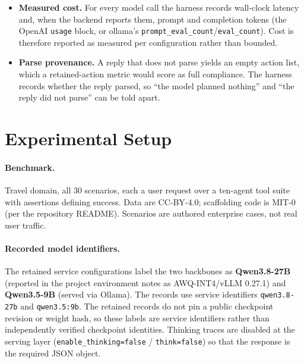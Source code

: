 \documentclass[11pt]{article}
\begin{document}
\begin{itemize}[leftmargin=*,itemsep=2pt]
      logged with the action, the verdict, the number of rounds it consumed, the
      raw reply, and a class: \texttt{explicit\_approve}, \texttt{explicit\_deny},
      \texttt{both\_tokens} (the reply contained both verdict words; the
      conservative choice is taken and the ambiguity is recorded),
      \texttt{unparsed} (no verdict within the round budget) or
      \texttt{all\_errors} (every call failed). Without this classification a
      refusal rate cannot be separated from a parser failure, which is why we
      report the class distribution rather than only the refusal rate.
\item \textbf{Measured cost.} For every model call the harness records wall-clock
      latency and, when the backend reports them, prompt and completion tokens (the
      OpenAI \texttt{usage} block, or ollama's
      \texttt{prompt\_eval\_count}/\texttt{eval\_count}). Cost is therefore
      reported as measured per configuration rather than bounded.
\item \textbf{Parse provenance.} A reply that does not parse yields an empty action
      list, which a retained-action metric would score as full compliance. The
      harness records whether the reply parsed, so ``the model planned nothing''
      and ``the reply did not parse'' can be told apart.
\end{itemize}

\section{Experimental Setup}
\label{sec:setup}

\paragraph{Benchmark.} Travel domain, all 30 scenarios, each a user request
over a ten-agent tool suite with assertions defining success. Data are
CC-BY-4.0; scaffolding code is MIT-0 (per the repository README). Scenarios are
authored enterprise cases, not real user traffic.

\paragraph{Recorded model identifiers.} The retained service configurations label the two backbones as \textbf{Qwen3.8-27B}
(reported in the project environment notes as AWQ-INT4/vLLM 0.27.1) and \textbf{Qwen3.5-9B} (served via Ollama).
The records use service identifiers \texttt{qwen3.8-27b} and \texttt{qwen3.5:9b}. The retained records do not pin a public checkpoint revision or weight hash, so these labels are service identifiers rather than independently verified checkpoint identities. Thinking traces are disabled at the serving layer
(\texttt{enable\_thinking=false} / \texttt{think=false}) so that the response is
the required JSON object.
\end{document}
